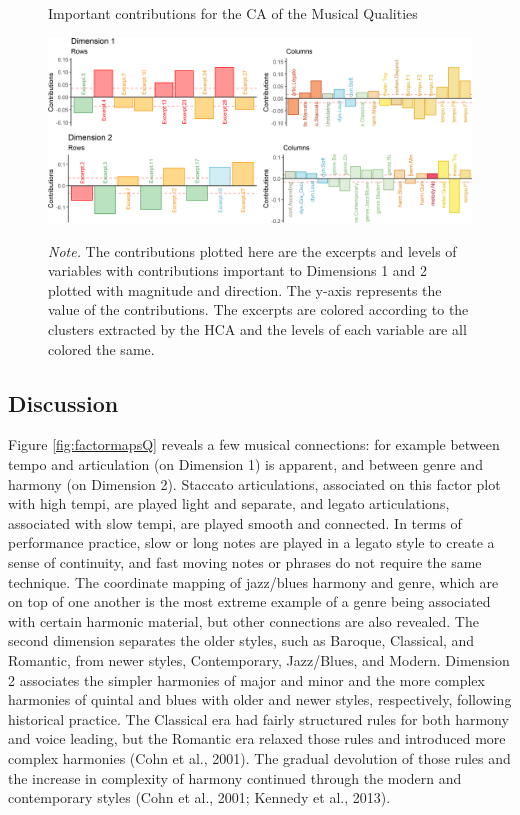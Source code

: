 \documentclass[
  english,
  man,floatsintext]{apa6}
\begin{document}
\begin{figure}   
  \centering  
  \caption{Important contributions for the CA of the Musical Qualities}
    \includegraphics{./Music-Descriptor-Space_files/figure-latex/contributionsQ-1.png}
  \label{fig:contributionsQ}
  \caption*{\footnotesize \textit{Note.} The contributions plotted here are the excerpts and levels of variables with contributions important to Dimensions 1 and 2 plotted with magnitude and direction. The y-axis represents the value of the contributions. The excerpts are colored according to the clusters extracted by the HCA and the levels of each variable are all colored the same.}
\end{figure}

\hypertarget{discussion}{%
\subsection{Discussion}\label{discussion}}

Figure \ref{fig:factormapsQ} reveals a few musical connections: for example between tempo and articulation (on Dimension 1) is apparent, and between genre and harmony (on Dimension 2). Staccato articulations, associated on this factor plot with high tempi, are played light and separate, and legato articulations, associated with slow tempi, are played smooth and connected. In terms of performance practice, slow or long notes are played in a legato style to create a sense of continuity, and fast moving notes or phrases do not require the same technique. The coordinate mapping of jazz/blues harmony and genre, which are on top of one another is the most extreme example of a genre being associated with certain harmonic material, but other connections are also revealed. The second dimension separates the older styles, such as Baroque, Classical, and Romantic, from newer styles, Contemporary, Jazz/Blues, and Modern. Dimension 2 associates the simpler harmonies of major and minor and the more complex harmonies of quintal and blues with older and newer styles, respectively, following historical practice. The Classical era had fairly structured rules for both harmony and voice leading, but the Romantic era relaxed those rules and introduced more complex harmonies (Cohn et al., 2001). The gradual devolution of those rules and the increase in complexity of harmony continued through the modern and contemporary styles (Cohn et al., 2001; Kennedy et al., 2013).
\end{document}

